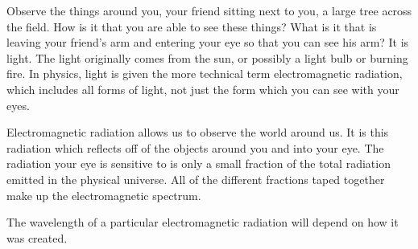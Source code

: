 Observe the things around you, your friend sitting next to you, a large tree across the field. How is it that you are able to see these things? What is it that is leaving your friend's arm and entering your eye so that you can see his arm? It is light. The light originally comes from the sun, or possibly a light bulb or burning fire. In physics, light is given the more technical term electromagnetic radiation, which includes all forms of light, not just the form which you can see with your eyes. 

Electromagnetic radiation allows us to observe the world around us. It is this radiation which reflects off of the objects around you and into your eye. The radiation your eye is sensitive to is only a small fraction of the total radiation emitted in the physical universe. All of the different fractions taped together make up the electromagnetic spectrum. 


The wavelength of a particular electromagnetic radiation will depend on how it was created. 

\clearpage


